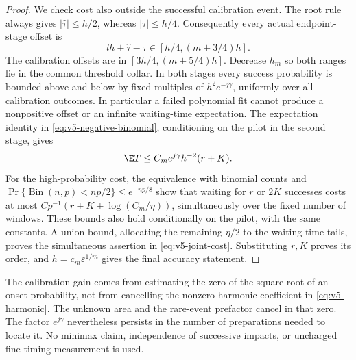 \begin{proof}
We check cost also outside the successful calibration event. The root
rule always gives $|\widehat\tau|\le h/2$, whereas $|\tau|\le h/4$.
Consequently every actual endpoint-stage offset is
\[
          lh+\widehat\tau-\tau\in[h/4,(m+3/4)h].
\]
The calibration offsets are in $[3h/4,(m+5/4)h]$. Decrease $h_m$ so
both ranges lie in the common threshold collar. In both stages every
success probability is bounded above and below by fixed multiples of
$h^2e^{-j\gamma}$, uniformly over all calibration outcomes. In
particular a failed polynomial fit cannot produce a nonpositive offset
or an infinite waiting-time expectation. The expectation identity in
\eqref{eq:v5-negative-binomial}, conditioning on the pilot in the second
stage, gives
\[
           \E T\le C_me^{j\gamma}h^{-2}(r+K).
\]
For the high-probability cost, the equivalence with binomial counts and
$\Pr\{\operatorname{Bin}(n,p)<np/2\}\le e^{-np/8}$ show that waiting
for $r$ or $2K$ successes costs at most
$C p^{-1}(r+K+\log(C_m/\eta))$, simultaneously over the fixed number
of windows. These bounds also hold conditionally on the pilot, with
the same constants. A union bound, allocating the remaining $\eta/2$
to the waiting-time tails, proves the simultaneous assertion in
\eqref{eq:v5-joint-cost}. Substituting $r,K$ proves its order, and
$h=c_m\varepsilon^{1/m}$ gives the final accuracy statement.
\end{proof}

The calibration gain comes from estimating the zero of the square root
of an onset probability, not from cancelling the nonzero harmonic
coefficient in \eqref{eq:v5-harmonic}. The unknown area and the rare-event
prefactor cancel in that zero. The factor $e^{j\gamma}$ nevertheless
persists in the number of preparations needed to locate it. No minimax
claim, independence of successive impacts, or uncharged fine timing
measurement is used.
